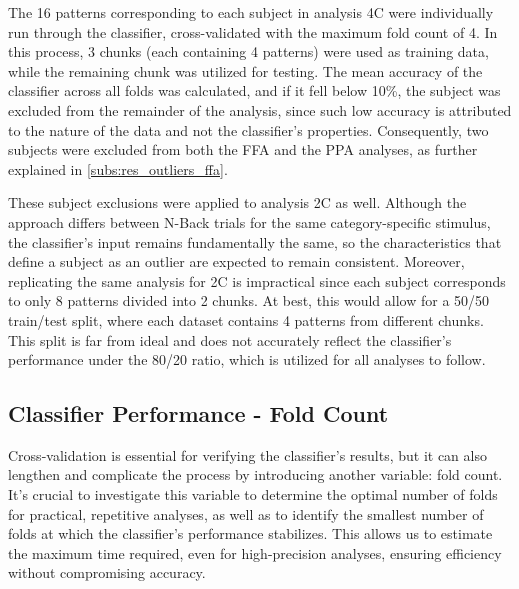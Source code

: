 The 16 patterns corresponding to each subject in analysis \gls{4C} were individually run through the classifier, cross-validated with the maximum fold count of 4. In this process, 3 chunks (each containing 4 patterns) were used as training data, while the remaining chunk was utilized for testing. The mean accuracy of the classifier across all folds was calculated, and if it fell below 10\%, the subject was excluded from the remainder of the analysis, since such low accuracy is attributed to the nature of the data and not the classifier's properties. Consequently, two subjects were excluded from both the \gls{FFA} and the \gls{PPA} analyses, as further explained in \autoref{subs:res_outliers_ffa}.

These subject exclusions were applied to analysis \gls{2C} as well. Although the approach differs between N-Back trials for the same category-specific stimulus, the classifier's input remains fundamentally the same, so the characteristics that define a subject as an outlier are expected to remain consistent. Moreover, replicating the same analysis for \gls{2C} is impractical since each subject corresponds to only 8 patterns divided into 2 chunks. At best, this would allow for a 50/50 train/test split, where each dataset contains 4 patterns from different chunks. This split is far from ideal and does not accurately reflect the classifier's performance under the 80/20 ratio, which is utilized for all analyses to follow.

\subsection{Classifier Performance - Fold Count}

Cross-validation is essential for verifying the classifier's results, but it can also lengthen and complicate the process by introducing another variable: fold count. It's crucial to investigate this variable to determine the optimal number of folds for practical, repetitive analyses, as well as to identify the smallest number of folds at which the classifier's performance stabilizes. This allows us to estimate the maximum time required, even for high-precision analyses, ensuring efficiency without compromising accuracy.

